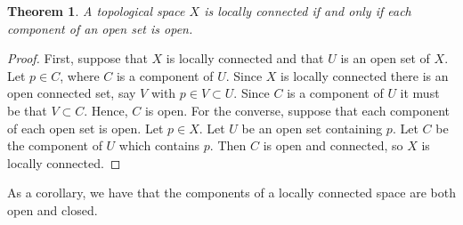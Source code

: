 \documentclass[12pt]{article}
\newtheorem*{thm}{Theorem}
\begin{document}
\begin{thm} A topological space $X$ is locally connected if and only if each component of an open set 
is open.
\end{thm}
\begin{proof}
First, suppose that $X$ is locally connected and that $U$ is an open set of $X$.
Let $p \in C$, where $C$ is a component of $U$.
Since $X$ is locally connected there is an open connected set, say $V$ with
$p \in V \subset U$. Since $C$ is a component of $U$ it must be that $V \subset C$.
Hence, $C$ is open.
For the converse, suppose that each component of each  open set is open. Let $p \in X$.
Let $U$ be an open set containing $p$. Let $C$ be the component of $U$ which
contains $p$. Then $C$ is open and connected, so $X$ is locally connected.

\end{proof}

As a corollary, we have that the components of a locally connected space are both
open and closed.

\end{document}
